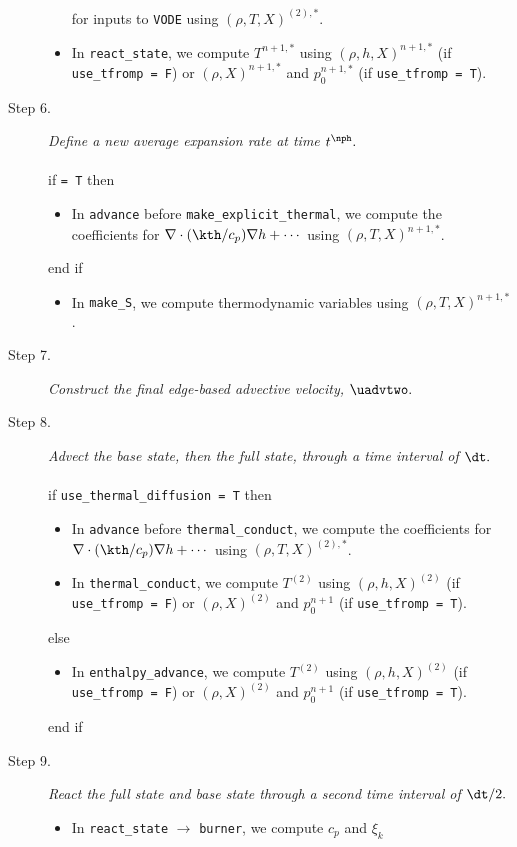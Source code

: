 \begin{description}
\begin{itemize}
for inputs to {\tt VODE} using $(\rho,T,X)^{(2),*}$.
\item In {\tt react\_state}, we compute $T^{n+1,*}$ using $(\rho,h,X)^{n+1,*}$ 
(if {\tt use\_tfromp = F}) or $(\rho,X)^{n+1,*}$ and $p_0^{n+1,*}$ (if {\tt use\_tfromp = T}).
\end{itemize}
\item[Step 6.] {\em Define a new average expansion rate at time $t^\nph.$}\\ \\
if  {\tt = T} then
\begin{itemize}
\item In {\tt advance} before {\tt make\_explicit\_thermal}, we compute the coefficients for 
$\nabla\cdot(\kth/c_p)\nabla h + \cdots$ using $(\rho,T,X)^{n+1,*}$.
\end{itemize}
end if
\begin{itemize}
\item In {\tt make\_S}, we compute thermodynamic variables using $(\rho,T,X)^{n+1,*}$.
\end{itemize}
\item[Step 7.] {\em Construct the final edge-based advective velocity, $\uadvtwo.$}
\item[Step 8.] {\em Advect the base state, then the full state, through a time interval 
of $\dt.$}\\ \\
if {\tt use\_thermal\_diffusion = T} then
%
\begin{itemize}
\item In {\tt advance} before {\tt thermal\_conduct}, we compute the coefficients for 
$\nabla\cdot(\kth/c_p)\nabla h + \cdots$ using $(\rho,T,X)^{(2),*}$.
\item In {\tt thermal\_conduct}, we compute $T^{(2)}$ using $(\rho,h,X)^{(2)}$
(if {\tt use\_tfromp = F}) or $(\rho,X)^{(2)}$ and $p_0^{n+1}$ (if {\tt use\_tfromp = T}).
\end{itemize}
else
\begin{itemize}
\item In {\tt enthalpy\_advance}, we compute $T^{(2)}$ using $(\rho,h,X)^{(2)}$
(if {\tt use\_tfromp = F}) or $(\rho,X)^{(2)}$ and $p_0^{n+1}$ (if {\tt use\_tfromp = T}).
\end{itemize}
end if
\item[Step 9.] {\em React the full state and base state through a second time interval 
of $\dt/2.$}
\begin{itemize}
\item In {\tt react\_state} $\rightarrow$ {\tt burner}, we compute $c_p$ and $\xi_k$ 

\end{itemize}
\end{description}
